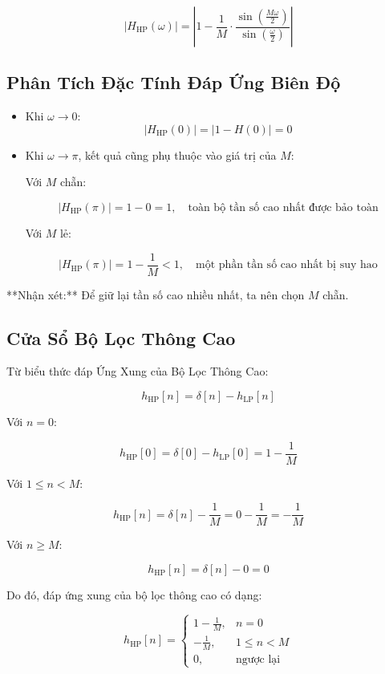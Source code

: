 \[
|H_{\mathrm{HP}}(\omega)| = \left| 1 - \frac{1}{M} \cdot \frac{\sin\left( \frac{M \omega}{2} \right)}{\sin\left( \frac{\omega}{2} \right)} \right|
\]

\subsection*{Phân Tích Đặc Tính Đáp Ứng Biên Độ}

\begin{itemize}
	\item Khi \( \omega \to 0 \):
	\[
	|H_{\mathrm{HP}}(0)| = |1 - H(0)| = 0
	\]
	
	\item Khi \( \omega \to \pi \), kết quả cũng phụ thuộc vào giá trị của \( M \):
	
	Với \( M \) chẵn:
	
	\[
	|H_{\mathrm{HP}}(\pi)| = 1 - 0 = 1, \quad \text{toàn bộ tần số cao nhất được bảo toàn}
	\]
	
	Với \( M \) lẻ:
	
	\[
	|H_{\mathrm{HP}}(\pi)| = 1 - \frac{1}{M} < 1, \quad \text{một phần tần số cao nhất bị suy hao}
	\]
\end{itemize}



**Nhận xét:** Để giữ lại tần số cao nhiều nhất, ta nên chọn \( M \) chẵn.

\subsection*{Cửa Sổ Bộ Lọc Thông Cao}
\label{sec:cua_so_loc_thong_cao}

Từ biểu thức đáp Ứng Xung của Bộ Lọc Thông Cao:

\[
h_{\mathrm{HP}}[n] = \delta[n] - h_{\mathrm{LP}}[n]
\]

Với \( n = 0 \):

\[
h_{\mathrm{HP}}[0] = \delta[0] - h_{\mathrm{LP}}[0] = 1 - \frac{1}{M}
\]

Với \( 1 \leq n < M \):

\[
h_{\mathrm{HP}}[n] = \delta[n] - \frac{1}{M} = 0 - \frac{1}{M} = -\frac{1}{M}
\]

Với \( n \geq M \):

\[
h_{\mathrm{HP}}[n] = \delta[n] - 0 = 0
\]

Do đó, đáp ứng xung của bộ lọc thông cao có dạng:

\[
h_{\mathrm{HP}}[n] =
\begin{cases}
	1 - \frac{1}{M}, & n = 0 \\
	-\frac{1}{M}, & 1 \leq n < M \\
	0, & \text{ngược lại}
\end{cases}
\]

